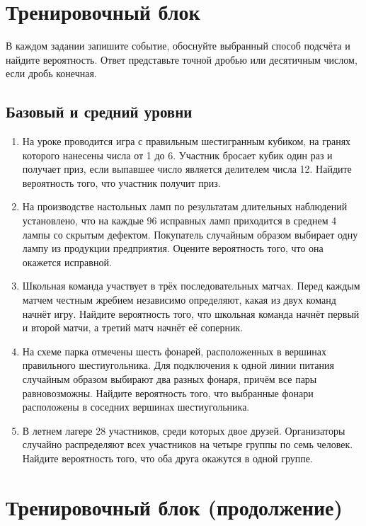 \documentclass[a4paper,12pt]{article}
\begin{document}
\clearpage
\section*{Тренировочный блок}
В каждом задании запишите событие, обоснуйте выбранный способ подсчёта и найдите вероятность. Ответ представьте точной дробью или десятичным числом, если дробь конечная.
\subsection*{Базовый и средний уровни}
\begin{enumerate}
\item На уроке проводится игра с правильным шестигранным кубиком, на гранях которого нанесены числа от 1 до 6. Участник бросает кубик один раз и получает приз, если выпавшее число является делителем числа 12. Найдите вероятность того, что участник получит приз.
\item На производстве настольных ламп по результатам длительных наблюдений установлено, что на каждые 96 исправных ламп приходится в среднем 4 лампы со скрытым дефектом. Покупатель случайным образом выбирает одну лампу из продукции предприятия. Оцените вероятность того, что она окажется исправной.
\item Школьная команда участвует в трёх последовательных матчах. Перед каждым матчем честным жребием независимо определяют, какая из двух команд начнёт игру. Найдите вероятность того, что школьная команда начнёт первый и второй матчи, а третий матч начнёт её соперник.
\item На схеме парка отмечены шесть фонарей, расположенных в вершинах правильного шестиугольника. Для подключения к одной линии питания случайным образом выбирают два разных фонаря, причём все пары равновозможны. Найдите вероятность того, что выбранные фонари расположены в соседних вершинах шестиугольника.
\item В летнем лагере 28 участников, среди которых двое друзей. Организаторы случайно распределяют всех участников на четыре группы по семь человек. Найдите вероятность того, что оба друга окажутся в одной группе.
\end{enumerate}
\clearpage
\section*{Тренировочный блок (продолжение)}
\end{document}
